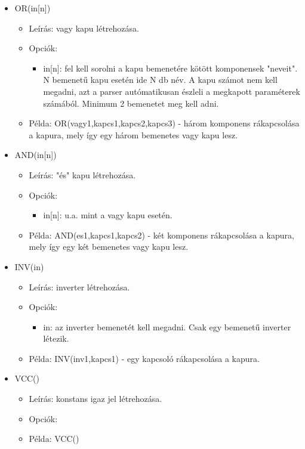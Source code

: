 \begin{itemize}
\item OR(in[n])
	\begin{itemize}
	\item Leírás: vagy kapu létrehozása.
	\item Opciók: 
		\begin{itemize}
			\item in[n]: fel kell sorolni a kapu bemenetére kötött komponensek "neveit". N bemenetű kapu esetén ide N db név. A kapu számot nem kell megadni, azt a parser autómatikusan észleli a megkapott paraméterek számából. Minimum 2 bemenetet meg kell adni.
		\end{itemize}
	\item Példa: OR(vagy1,kapcs1,kapcs2,kapcs3) - három komponens rákapcsolása a kapura, mely így egy három bemenetes vagy kapu lesz.
	\end{itemize}

\item AND(in[n])
	\begin{itemize}
	\item Leírás: "és" kapu létrehozása.
	\item Opciók: 
		\begin{itemize}
			\item in[n]: u.a. mint a vagy kapu esetén.
		\end{itemize}
	\item Példa: AND(es1,kapcs1,kapcs2) - két komponens rákapcsolása a kapura, mely így egy két bemenetes vagy kapu lesz.
	\end{itemize}
	
\item INV(in)
	\begin{itemize}
	\item Leírás: inverter létrehozása.
	\item Opciók: 
		\begin{itemize}
			\item in: az inverter bemenetét kell megadni. Csak egy bemenetű inverter létezik.
		\end{itemize}
	\item Példa: INV(inv1,kapcs1) - egy kapcsoló rákapcsolása a kapura.
	\end{itemize}
	
\item VCC()
	\begin{itemize}
	\item Leírás: konstans igaz jel létrehozása.
	\item Opciók: 
	\item Példa: VCC()
	\end{itemize}
	

\end{itemize}
